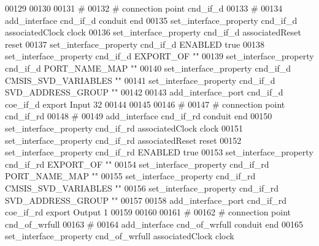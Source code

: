 \begin{DoxyCode}
00129 \textcolor{comment}{}
00130 
00131 \textcolor{comment}{# }
00132 \textcolor{comment}{}\textcolor{comment}{# connection point cnd\_if\_d}
00133 \textcolor{comment}{}\textcolor{comment}{# }
00134 \textcolor{comment}{}add\_interface cnd\_if\_d conduit end\textcolor{comment}{}
00135 \textcolor{comment}{}set\_interface\_property cnd\_if\_d associatedClock clock\textcolor{comment}{}
00136 \textcolor{comment}{}set\_interface\_property cnd\_if\_d associatedReset reset\textcolor{comment}{}
00137 \textcolor{comment}{}set\_interface\_property cnd\_if\_d ENABLED true\textcolor{comment}{}
00138 \textcolor{comment}{}set\_interface\_property cnd\_if\_d EXPORT\_OF ""\textcolor{comment}{}
00139 \textcolor{comment}{}set\_interface\_property cnd\_if\_d PORT\_NAME\_MAP ""\textcolor{comment}{}
00140 \textcolor{comment}{}set\_interface\_property cnd\_if\_d CMSIS\_SVD\_VARIABLES ""\textcolor{comment}{}
00141 \textcolor{comment}{}set\_interface\_property cnd\_if\_d SVD\_ADDRESS\_GROUP ""\textcolor{comment}{}
00142 \textcolor{comment}{}
00143 add\_interface\_port cnd\_if\_d coe\_if\_d export Input 32\textcolor{comment}{}
00144 \textcolor{comment}{}
00145 
00146 \textcolor{comment}{# }
00147 \textcolor{comment}{}\textcolor{comment}{# connection point cnd\_if\_rd}
00148 \textcolor{comment}{}\textcolor{comment}{# }
00149 \textcolor{comment}{}add\_interface cnd\_if\_rd conduit end\textcolor{comment}{}
00150 \textcolor{comment}{}set\_interface\_property cnd\_if\_rd associatedClock clock\textcolor{comment}{}
00151 \textcolor{comment}{}set\_interface\_property cnd\_if\_rd associatedReset reset\textcolor{comment}{}
00152 \textcolor{comment}{}set\_interface\_property cnd\_if\_rd ENABLED true\textcolor{comment}{}
00153 \textcolor{comment}{}set\_interface\_property cnd\_if\_rd EXPORT\_OF ""\textcolor{comment}{}
00154 \textcolor{comment}{}set\_interface\_property cnd\_if\_rd PORT\_NAME\_MAP ""\textcolor{comment}{}
00155 \textcolor{comment}{}set\_interface\_property cnd\_if\_rd CMSIS\_SVD\_VARIABLES ""\textcolor{comment}{}
00156 \textcolor{comment}{}set\_interface\_property cnd\_if\_rd SVD\_ADDRESS\_GROUP ""\textcolor{comment}{}
00157 \textcolor{comment}{}
00158 add\_interface\_port cnd\_if\_rd coe\_if\_rd export Output 1\textcolor{comment}{}
00159 \textcolor{comment}{}
00160 
00161 \textcolor{comment}{# }
00162 \textcolor{comment}{}\textcolor{comment}{# connection point cnd\_of\_wrfull}
00163 \textcolor{comment}{}\textcolor{comment}{# }
00164 \textcolor{comment}{}add\_interface cnd\_of\_wrfull conduit end\textcolor{comment}{}
00165 \textcolor{comment}{}set\_interface\_property cnd\_of\_wrfull associatedClock clock\textcolor{comment}{}

\end{DoxyCode}
